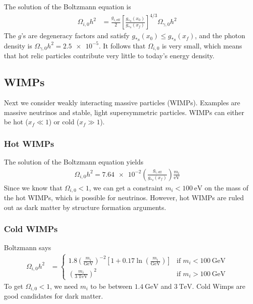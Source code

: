 The solution of the Boltzmann equation is
	\begin{align*}
		\Omega_{i,0} h^2
		&= \frac{ g_{i,\text{eff}} }{2}  \left[ \frac{g_{*s}(x_0)}{g_{*s}(x_f)} \right]^{4/3} \Omega_{\gamma, 0} h^2
	\end{align*}
The $g$'s are degeneracy factors and satisfy $g_{*s}(x_0) \leq g_{*s}(x_f)$, and the photon density is $\Omega_{\gamma,0} h^2 = \num{2.5e-5}$. It follows that $\Omega_{i,0}$ is very small, which means that hot relic particles contribute very little to today's energy density.

\subsection{WIMPs}
Next we consider weakly interacting massive particles (WIMPs). Examples are massive neutrinos and stable, light supersymmetric particles. WIMPs can either be hot ($x_f \ll 1$) or cold ($x_f \gg 1$).

\subsubsection{Hot WIMPs}
The solution of the Boltzmann equation yields
\begin{align*}
	\Omega_{i,0} h^2 = \num{7.64e-2} 
	\left( \frac{g_{i,\text{eff}}}{g_{*s}(x_f)} \right)
	\frac{m_i}{\si{\eV}}
\end{align*}
Since we know that $\Omega_{i,0} < 1$, we can get a constraint $m_i < \SI{100}{\eV}$ on the mass of the hot WIMPs, which is possible for neutrinos. However, hot WIMPs are ruled out as dark matter by structure formation arguments.

\subsubsection{Cold WIMPs}
Boltzmann says
\begin{align*}
	\Omega_{i,0} h^2
	&= \begin{cases}
	1.8 \left( \frac{m_i}{\si{\GeV}} \right)^{-2} 
	\left[ 1 + 0.17 \ln\left( \frac{m_i}{\si{\GeV}} \right) \right]
	& \text{if } m_i < \SI{100}{\GeV}\\
	\left( \frac{m_i}{\SI{3}{\TeV}} \right)^2
	& \text{if } m_i > \SI{100}{\GeV}
	\end{cases}
\end{align*}
To get $\Omega_{i,0} < 1$, we need $m_i$ to be between $\SI{1.4}{\GeV}$ and $\SI{3}{\TeV}$. Cold Wimps are good candidates for dark matter.

